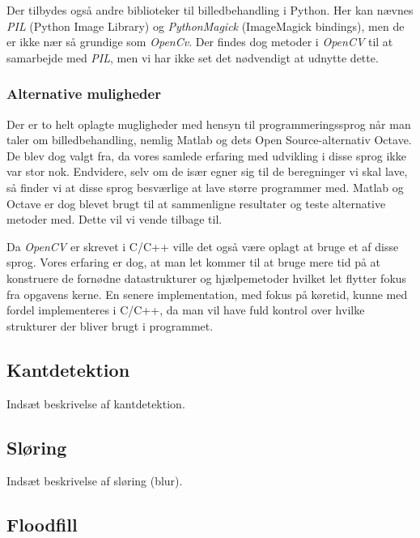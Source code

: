 {Der tilbydes også andre biblioteker til billedbehandling i Python. Her
kan nævnes \emph{PIL} (Python Image Library) og \emph{PythonMagick}
(ImageMagick bindings), men de er ikke nær så grundige som
\emph{OpenCv}. Der findes dog metoder i \emph{OpenCV} til at samarbejde
med \emph{PIL}, men vi har ikke set det nødvendigt at udnytte dette.


\subsubsection{Alternative muligheder}
Der er to helt oplagte mugligheder med hensyn til programmeringssprog
når man taler om billedbehandling, nemlig Matlab og dets Open
Source-alternativ Octave. De blev dog valgt fra, da vores samlede
erfaring med udvikling i disse sprog ikke var stor nok. Endvidere, selv
om de især egner sig til de beregninger vi skal lave, så finder vi at
disse sprog besværlige at lave større programmer med. Matlab og Octave
er dog blevet brugt til at sammenligne resultater og teste alternative
metoder med. Dette vil vi vende tilbage til.

Da \emph{OpenCV} er skrevet i C/C++ ville det også være oplagt at bruge et af
disse sprog. Vores erfaring er dog, at man let kommer til at bruge mere
tid på at konstruere de fornødne datastrukturer og hjælpemetoder hvilket
let flytter fokus fra opgavens kerne. En senere implementation, med
fokus på køretid, kunne med fordel implementeres i C/C++, da man vil
have fuld kontrol over hvilke strukturer der bliver brugt i programmet.

\subsection{Kantdetektion}
Indsæt beskrivelse af kantdetektion.

\subsection{Sløring}
Indsæt beskrivelse af sløring (blur).

\subsection{Floodfill}


}

